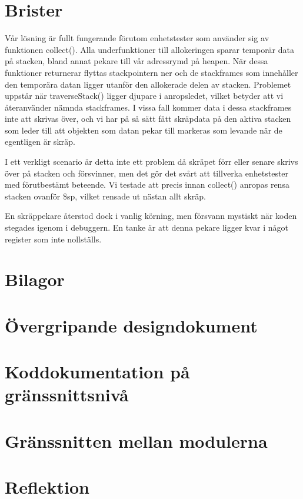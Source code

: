 \documentclass{article}
\begin{document}
\section{Brister}

Vår lösning är fullt fungerande förutom enhetstester som använder sig av funktionen collect(). Alla underfunktioner till allokeringen sparar temporär data på stacken, bland annat pekare till vår adressrymd på heapen. När dessa funktioner returnerar flyttas stackpointern ner och de stackframes som innehåller den temporära datan ligger utanför den allokerade delen av stacken. Problemet uppstår när traverseStack() ligger djupare i anropsledet, vilket betyder att vi återanvänder nämnda stackframes. I vissa fall kommer data i dessa stackframes inte att skrivas över, och vi har på så sätt fått skräpdata på den aktiva stacken som leder till att objekten som datan pekar till markeras som levande när de egentligen är skräp.

I ett verkligt scenario är detta inte ett problem då skräpet förr eller senare skrivs över på stacken och försvinner, men det gör det svårt att tillverka enhetstester med förutbestämt beteende. Vi testade att precis innan collect() anropas rensa stacken ovanför \$sp, vilket rensade ut nästan allt skräp.

En skräppekare återstod dock i vanlig körning, men försvann mystiskt när koden stegades igenom i debuggern. En tanke är att denna pekare ligger kvar i något register som inte nollställs.

\section{Bilagor}
\appendix
\section{Övergripande designdokument}
\label{appendix:design}

\section{Koddokumentation på gränssnittsnivå}
\label{appendix:code}

\section{Gränssnitten mellan modulerna}
\label{appendix:interface}

\section{Reflektion}
\label{appendix:reflection}

\end{document}
